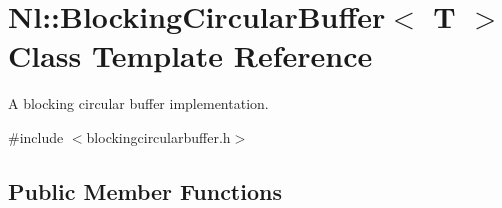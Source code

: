 \hypertarget{classNl_1_1BlockingCircularBuffer}{}\section{Nl\+:\+:Blocking\+Circular\+Buffer$<$ T $>$ Class Template Reference}
\label{classNl_1_1BlockingCircularBuffer}


A blocking circular buffer implementation.  




{\ttfamily \#include $<$blockingcircularbuffer.\+h$>$}

\subsection*{Public Member Functions}
